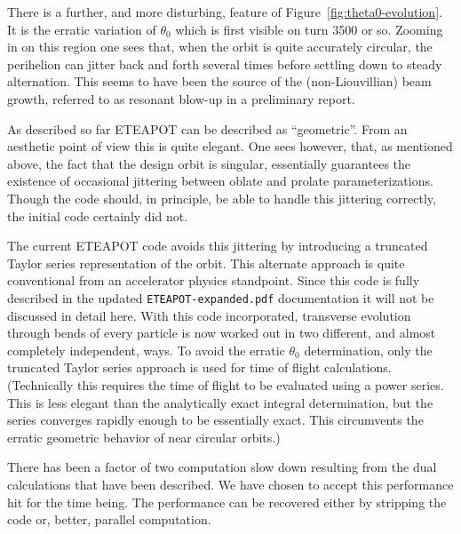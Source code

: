 \documentclass[]{article}
\begin{document}
There is a further, and more disturbing, feature of Figure~\ref{fig:theta0-evolution}.
It is the erratic variation of $\theta_0$ which is first visible on turn 
3500 or so. Zooming in on this region one sees that, when the orbit
is quite accurately circular, the perihelion can jitter back and forth
several times before settling down to steady alternation.
This seems to have been the source of the (non-Liouvillian) beam growth,
referred to as resonant blow-up in a preliminary report.

As described so far ETEAPOT can be described as ``geometric''. From
an aesthetic point of view this is quite elegant. One sees however, that,
as mentioned above, the fact that the design orbit is singular, essentially
guarantees the existence of occasional jittering between oblate and
prolate parameterizations. Though the code should, in principle, be able
to handle this jittering correctly, the initial code certainly did not. 

The current ETEAPOT code avoids this jittering by introducing a truncated
Taylor series representation of the orbit. This alternate approach is
quite conventional from an accelerator physics standpoint.
Since this code is fully described in the updated {\tt ETEAPOT-expanded.pdf} 
documentation it will not be discussed in detail here. With this code 
incorporated, transverse evolution through bends of every particle is now worked 
out in two different, and almost completely independent, ways.
To avoid the erratic $\theta_0$ determination, only the truncated Taylor series 
approach is used for time of flight calculations. (Technically this requires 
the time of flight to be evaluated using a power series. This is less elegant 
than the analytically exact integral determination, but the series
converges rapidly enough to be essentially exact. This circumvents the 
erratic geometric behavior of near circular orbits.) 

There has been a factor of two computation slow down
resulting from the dual calculations that have been described. We have 
chosen to accept this performance hit for the time being. The performance can be 
recovered either by stripping the code or, better, parallel computation.
\end{document}
